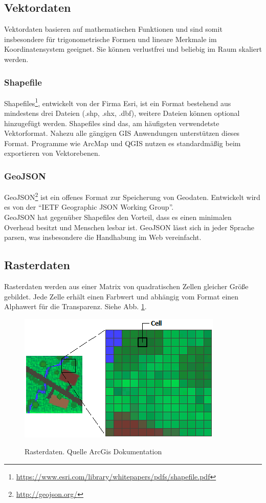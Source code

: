 \documentclass[10pt,conference,compsocconf]{IEEEtran}
\begin{document}
\subsection{Vektordaten}
Vektordaten basieren auf mathematischen Funktionen und sind somit insbesondere für trigonometrische Formen und lineare Merkmale im Koordinatensystem geeignet. Sie können verlustfrei und beliebig im Raum skaliert werden.

\subsubsection{Shapefile}
Shapefiles\footnote{\url{https://www.esri.com/library/whitepapers/pdfs/shapefile.pdf}}, entwickelt von der Firma Esri, ist ein Format bestehend aus mindestens drei Dateien (.shp, .shx, .dbf), weitere Dateien können optional hinzugefügt werden. Shapefiles sind das, am häufigsten verwendetste Vektorformat. Nahezu alle gängigen GIS Anwendungen unterstützen dieses Format. Programme wie ArcMap und QGIS nutzen es standardmäßig beim exportieren von Vektorebenen.

\subsubsection{GeoJSON}
GeoJSON\footnote{\url{http://geojson.org/}} ist ein offenes Format zur Speicherung von Geodaten. Entwickelt wird es von der \enquote{IETF Geographic JSON Working Group}. \\
GeoJSON hat gegenüber Shapefiles den Vorteil, dass es einen minimalen Overhead besitzt und Menschen lesbar ist. \mbox{GeoJSON} lässt sich in jeder Sprache parsen, was insbesondere die Handhabung im Web vereinfacht.


\subsection{Rasterdaten}
Rasterdaten werden aus einer Matrix von quadratischen Zellen gleicher Größe gebildet. Jede Zelle erhält einen Farbwert und abhängig vom Format einen Alphawert für die Transparenz. Siehe Abb. \ref{img:rasterdaten}. \\
\begin{figure}[H]
	\centering
	\includegraphics[width=0.75\columnwidth]{img/rasterdaten}\\
	\caption[]{Rasterdaten. Quelle ArcGis Dokumentation\footnotemark}
	\label{img:rasterdaten}
\end{figure}
\end{document}
